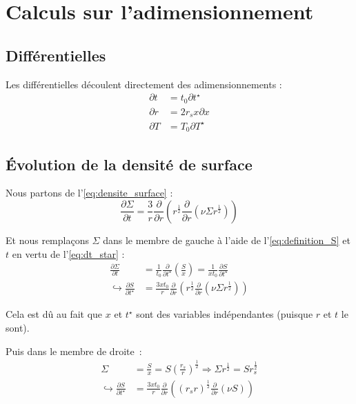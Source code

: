 \section{Calculs sur l’adimensionnement}
\label{app:adimensionnement}

\subsection{Différentielles}

Les différentielles découlent directement des adimensionnements :
\begin{align}
    \label{eq:dt_star}
    \partial t &= t_0 \partial t^{\star} \\
    \label{eq:dr_star}
    \partial r &= 2 r_s x \partial x \\
    \label{eq:dT_star}
    \partial T &= T_0 \partial T^{\star}
\end{align}

\subsection{Évolution de la densité de surface}

Nous partons de l’\cref{eq:densite_surface} :
\begin{equation}
    \frac{\partial \Sigma}{\partial t} = \frac{3}{r} \frac{\partial}{\partial r} \left( r^\frac{1}{2} \frac{\partial}{\partial r} \left( \nu \Sigma r^\frac{1}{2} \right) \right)
\end{equation}

Et nous remplaçons $\Sigma$ dans le membre de gauche à l’aide de
l’\cref{eq:definition_S} et $t$ en vertu de l’\cref{eq:dt_star} :
\begin{align}
    \frac{\partial \Sigma}{\partial t} &= \frac{1}{t_0} \frac{\partial}{\partial t^\star} \left( \frac{S}{x} \right) = \frac{1}{x t_0} \frac{\partial S}{\partial t^\star} \\
    \hookrightarrow \frac{\partial S}{\partial t^\star} &= \frac{3 x t_0}{r} \frac{\partial}{\partial r} \left( r^\frac{1}{2} \frac{\partial}{\partial r} \left( \nu \Sigma r^\frac{1}{2} \right) \right)
\end{align}

Cela est dû au fait que $x$ et $t^\star$ sont des variables indépendantes
(puisque $r$ et $t$ le sont).

Puis dans le membre de droite :
\begin{align}
    \Sigma &= \frac{S}{x} = S \left( \frac{r_s}{r} \right)^\frac{1}{2} \Rightarrow \Sigma r^\frac{1}{2} = S r_s^\frac{1}{2} \\
    \hookrightarrow \frac{\partial S}{\partial t^\star} &= \frac{3 x t_0}{r} \frac{\partial}{\partial r} \left( (r_s r)^\frac{1}{2} \frac{\partial}{\partial r} \left( \nu S \right) \right) \\
\end{align}


